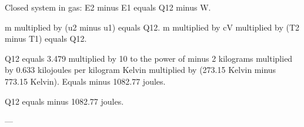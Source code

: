 Closed system in gas:  
E2 minus E1 equals Q12 minus W.  

m multiplied by (u2 minus u1) equals Q12.  
m multiplied by cV multiplied by (T2 minus T1) equals Q12.  

Q12 equals 3.479 multiplied by 10 to the power of minus 2 kilograms multiplied by 0.633 kilojoules per kilogram Kelvin multiplied by (273.15 Kelvin minus 773.15 Kelvin).  
Equals minus 1082.77 joules.  

Q12 equals minus 1082.77 joules.  

---